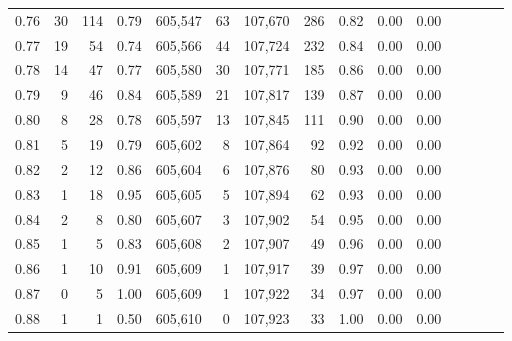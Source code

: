 \begin{tabular}{rrrcrrrrrrrrrrr}
0.76 &      30 &    114 &                                       0.79 &  605,547 &       63 &  107,670 &      286 &  0.82 &  0.00 &                         0.00 \\
0.77 &      19 &     54 &                                       0.74 &  605,566 &       44 &  107,724 &      232 &  0.84 &  0.00 &                         0.00 \\
0.78 &      14 &     47 &                                       0.77 &  605,580 &       30 &  107,771 &      185 &  0.86 &  0.00 &                         0.00 \\
0.79 &       9 &     46 &                                       0.84 &  605,589 &       21 &  107,817 &      139 &  0.87 &  0.00 &                         0.00 \\
0.80 &       8 &     28 &                                       0.78 &  605,597 &       13 &  107,845 &      111 &  0.90 &  0.00 &                         0.00 \\
0.81 &       5 &     19 &                                       0.79 &  605,602 &        8 &  107,864 &       92 &  0.92 &  0.00 &                         0.00 \\
0.82 &       2 &     12 &                                       0.86 &  605,604 &        6 &  107,876 &       80 &  0.93 &  0.00 &                         0.00 \\
0.83 &       1 &     18 &                                       0.95 &  605,605 &        5 &  107,894 &       62 &  0.93 &  0.00 &                         0.00 \\
0.84 &       2 &      8 &                                       0.80 &  605,607 &        3 &  107,902 &       54 &  0.95 &  0.00 &                         0.00 \\
0.85 &       1 &      5 &                                       0.83 &  605,608 &        2 &  107,907 &       49 &  0.96 &  0.00 &                         0.00 \\
0.86 &       1 &     10 &                                       0.91 &  605,609 &        1 &  107,917 &       39 &  0.97 &  0.00 &                         0.00 \\
0.87 &       0 &      5 &                                       1.00 &  605,609 &        1 &  107,922 &       34 &  0.97 &  0.00 &                         0.00 \\
0.88 &       1 &      1 &                                       0.50 &  605,610 &        0 &  107,923 &       33 &  1.00 &  0.00 &                         0.00 \\

\end{tabular}
